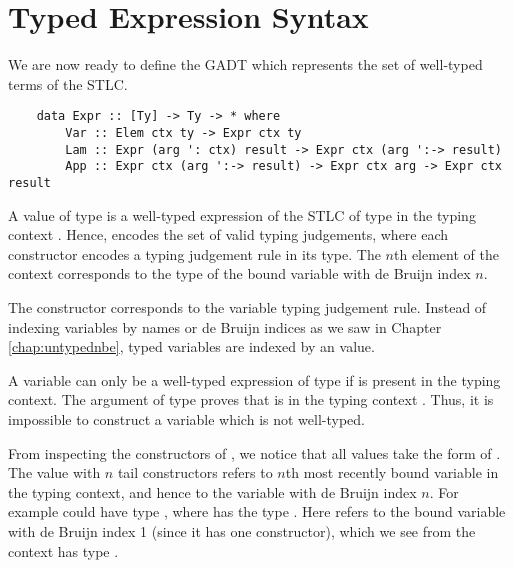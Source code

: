 
\section{Typed Expression Syntax}
\label{sect:typedsyntax}

We are now ready to define the  GADT which represents the set of well-typed terms of the STLC.

\begin{lstlisting}
    data Expr :: [Ty] -> Ty -> * where
        Var :: Elem ctx ty -> Expr ctx ty
        Lam :: Expr (arg ': ctx) result -> Expr ctx (arg ':-> result)
        App :: Expr ctx (arg ':-> result) -> Expr ctx arg -> Expr ctx result 
\end{lstlisting}

A value of type  is a well-typed expression of the STLC of type  in the typing context . Hence,  encodes the set of valid typing judgements, where each constructor encodes a typing judgement rule in its type. The $n$th element of the context corresponds to the type of the bound variable with de Bruijn index $n$.

The  constructor corresponds to the variable typing judgement rule. Instead of indexing variables by names or de Bruijn indices as we saw in Chapter \ref{chap:untypednbe}, typed variables are indexed by an  value.


A variable can only be a well-typed expression of type  if  is present in the typing context. The argument of type  proves that  is in the typing context . Thus, it is impossible to construct a variable which is not well-typed.

From inspecting the constructors of , we notice that all  values take the form of . 
The  value with $n$ tail constructors refers to $n$th most recently bound variable in the typing context, and hence to the variable with de Bruijn index $n$. For example  could have type , where  has the type . Here  refers to the bound variable with de Bruijn index 1 (since it has one  constructor), which we see from the context has type .

